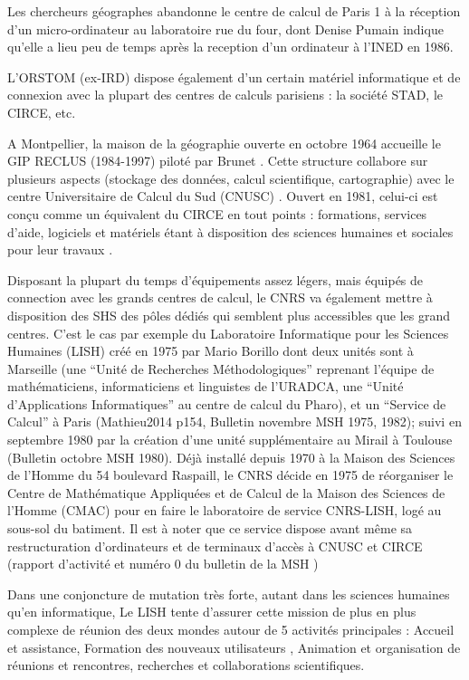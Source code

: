 Les chercheurs géographes abandonne le centre de calcul de Paris 1 à la réception d'un micro-ordinateur au laboratoire rue du four, dont Denise Pumain indique qu'elle a lieu peu de temps après la reception d'un ordinateur à l'INED en 1986. 

L’ORSTOM (ex-IRD) dispose également d’un certain matériel informatique et de connexion avec la plupart des centres de calculs parisiens : la société STAD, le CIRCE, etc. \autocite{Dejardin1992}

A Montpellier, la maison de la géographie ouverte en octobre 1964 accueille le GIP RECLUS (1984-1997) piloté par Brunet \autocite{Brunet1988}. Cette structure collabore sur plusieurs aspects (stockage des données, calcul scientifique, cartographie) avec le centre Universitaire de Calcul du Sud (CNUSC) \autocite{Waniez2010}. Ouvert en 1981, celui-ci est conçu comme un équivalent du CIRCE en tout points : formations, services d’aide, logiciels et matériels étant à disposition des sciences humaines et sociales pour leur travaux  .

Disposant la plupart du temps d'équipements assez légers, mais équipés de connection avec les grands centres de calcul, le CNRS va également mettre à disposition des SHS des pôles dédiés qui semblent plus accessibles que les grand centres. C’est le cas par exemple du Laboratoire Informatique pour les Sciences Humaines (LISH) \autocite{MSH1975} créé en 1975 par Mario Borillo dont deux unités sont à Marseille (une \enquote{Unité de Recherches Méthodologiques} reprenant l'équipe de mathématiciens, informaticiens et linguistes de l'URADCA, une \enquote{Unité d’Applications Informatiques} au centre de calcul du Pharo), et un \enquote{Service de Calcul} à Paris (Mathieu2014 p154, Bulletin novembre MSH 1975, 1982); suivi en septembre 1980 par la création d’une unité supplémentaire au Mirail à Toulouse (Bulletin octobre MSH 1980). Déjà installé depuis 1970 à la Maison des Sciences de l'Homme du 54 boulevard Raspaill, le CNRS décide en 1975 de réorganiser le Centre de Mathématique Appliquées et de Calcul de la Maison des Sciences de l’Homme (CMAC) pour en faire le laboratoire de service CNRS-LISH, logé au sous-sol du batiment. Il est à noter que ce service dispose avant même sa restructuration d’ordinateurs et de terminaux d’accès à CNUSC et CIRCE (rapport d’activité \autocite{CNRS1972} et numéro 0 du bulletin de la MSH \autocite{MSH1973})

Dans une conjoncture de mutation très forte, autant dans les sciences humaines qu'en informatique, Le LISH tente d'assurer cette mission de plus en plus complexe de réunion des deux mondes autour de 5 activités principales : Accueil et assistance, Formation des nouveaux utilisateurs , Animation et organisation de réunions et rencontres, recherches et collaborations scientifiques. \autocite{LISH1980}

